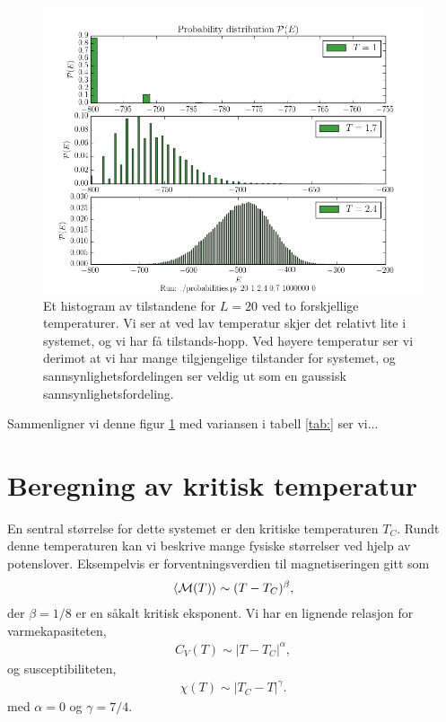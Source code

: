 \documentclass[11pt]{article}
\begin{document}
\begin{figure}[ht]
  \centering
  \includegraphics[scale=0.7]{../fig/prob_E.png}
  \caption{Et histogram av tilstandene for $L=20$ ved to 
forskjellige temperaturer. Vi ser at ved lav temperatur
skjer det relativt lite i systemet, og vi har få tilstands-hopp. Ved høyere temperatur ser vi derimot at vi har mange tilgjengelige tilstander for systemet, og 
sannsynlighetsfordelingen ser veldig ut som en gaussisk sannsynlighetsfordeling.}
\label{fig:probabilities}
\end{figure}

Sammenligner vi denne figur \ref{fig:probabilities} med variansen i tabell \ref{tab:} ser vi...



\section{Beregning av kritisk temperatur}
En sentral størrelse for dette systemet er den kritiske temperaturen
$T_C$. Rundt denne temperaturen kan vi beskrive mange fysiske
størrelser ved hjelp av potenslover. Eksempelvis er
forventningsverdien til magnetiseringen gitt som 
\begin{align}
  \langle \mathcal{M}(T) \rangle \sim (T - T_C)^{\beta},
\end{align}
der $\beta=1/8$ er en såkalt kritisk eksponent. Vi har en lignende
relasjon for varmekapasiteten,
\begin{align}
  C_V(T) \sim |T-T_C|^{\alpha},
\end{align}
og susceptibiliteten,
\begin{align}
  \chi(T) \sim |T_C - T|^{\gamma}.
\end{align}
med $\alpha=0$ og $\gamma=7/4$.
\end{document}
